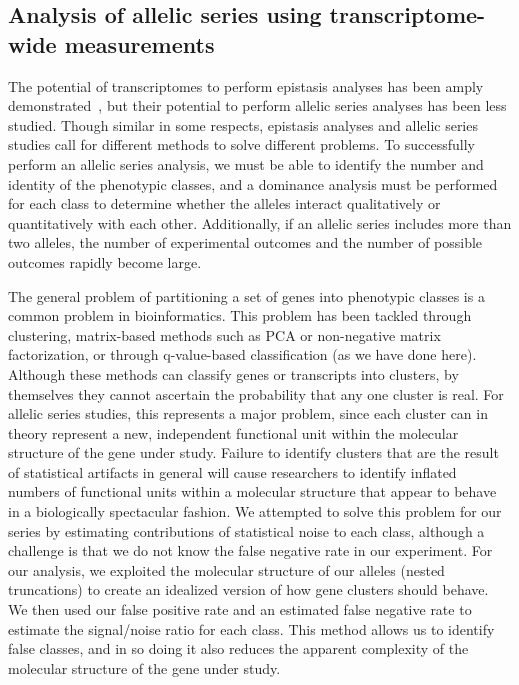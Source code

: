 \documentclass[10pt, twocolumn]{article}
\begin{document}
\subsection*{Analysis of allelic series using transcriptome-wide measurements}
The potential of transcriptomes to perform epistasis analyses has been amply
demonstrated~\cite{Dixit2016,Angeles-Albores2017}, but their potential to
perform allelic series analyses has been less studied. Though similar in some
respects, epistasis analyses and allelic series studies call for different
methods to solve different problems. To successfully perform an allelic series
analysis, we must be able to identify the number and identity of the phenotypic
classes, and a dominance analysis must be performed for each class to determine
whether the alleles interact qualitatively or quantitatively with each other.
Additionally, if an allelic series includes more than two alleles, the number of
experimental outcomes and the number of possible outcomes rapidly become large.

The general problem of partitioning a set of genes into phenotypic classes is a
common problem in bioinformatics. This problem has been tackled through
clustering, matrix-based methods such as PCA or non-negative
matrix factorization, or through q-value-based classification (as we have done
here). Although these methods can classify genes or transcripts into clusters,
by themselves they cannot ascertain the probability that any one cluster is real.
For allelic series studies, this represents a major problem, since each cluster
can in theory represent a new, independent functional unit within the molecular
structure of the gene under study. Failure to identify clusters that are the
result of statistical artifacts in general will cause researchers to identify
inflated numbers of functional units within a molecular structure that appear to
behave in a biologically spectacular fashion. We attempted to solve this problem
for our series by estimating contributions of statistical noise to each class,
although a challenge is that we do not know the false negative rate in our
experiment. For our analysis, we exploited the molecular structure of our
alleles (nested truncations) to create an idealized version of how gene clusters
should behave. We then used our false positive rate and an estimated false
negative rate to estimate the signal/noise ratio for each class. This method
allows us to identify false classes, and in so doing it also reduces the apparent
complexity of the molecular structure of the gene under study.
\end{document}
